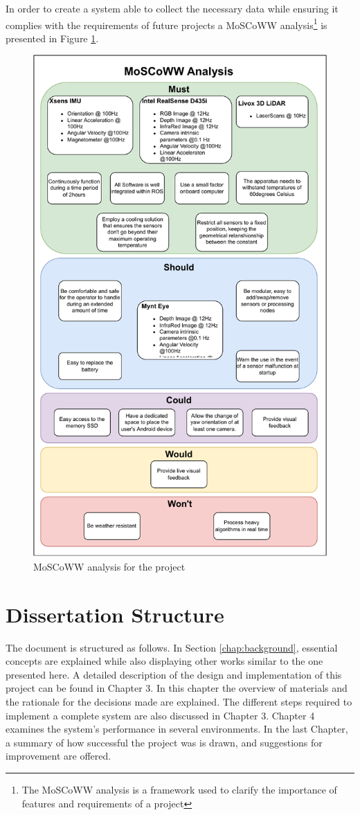 In order to create a system able to collect the necessary data while ensuring it complies with the requirements of future projects a MoSCoWW analysis\footnote{The MoSCoWW analysis is a framework used to clarify the importance of features and requirements of a project} is presented in Figure \ref{fig: moscoww}.

\begin{figure}[H]
    \centering
    \includegraphics[width=0.65\linewidth]{images/introduction/moscoww_analysis.pdf}
    \caption{MoSCoWW analysis for the project}
    \label{fig: moscoww}
\end{figure}

\section{Dissertation Structure}
The document is structured as follows. In Section \ref*{chap:background}, essential concepts are explained while also displaying other works similar to the one presented here. A detailed description of the design and implementation of this project can be found in Chapter 3. In this chapter the overview of materials and the rationale for the decisions made are explained. The different steps required to implement a complete system are also discussed in Chapter 3. Chapter 4 examines the system's performance in several environments. In the last Chapter, a summary of how successful the project was is drawn, and suggestions for improvement are offered.